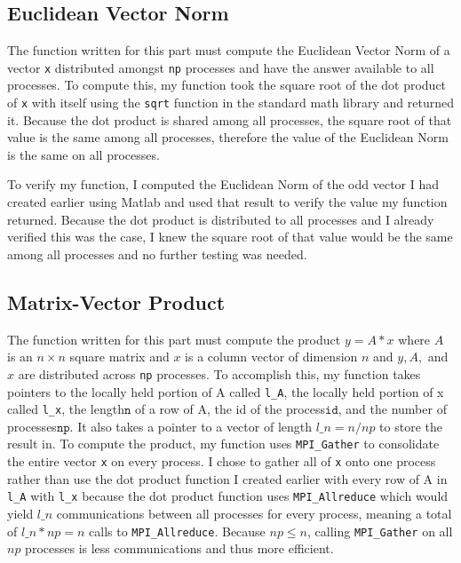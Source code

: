 \documentclass[11pt]{article}
\begin{document}
\subsection{Euclidean Vector Norm}
The function written for this part must compute the Euclidean Vector Norm of a vector \texttt{x} distributed amongst \texttt{np} processes and have the answer available to all processes. To compute this, my function took the square root of the dot product of \texttt{x} with itself using the \texttt{sqrt} function in the standard math library and returned it. Because the dot product is shared among all processes, the square root of that value is the same among all processes, therefore the value of the Euclidean Norm is the same on all processes.

To verify my function, I computed the Euclidean Norm of the odd vector I had created earlier using Matlab and used that result to verify the value my function returned. Because the dot product is distributed to all processes and I already verified this was the case, I knew the square root of that value would be the same among all processes and no further testing was needed.

\subsection{Matrix-Vector Product}
The function written for this part must compute the product $y=A*x$ where $A$ is an $n \times n$ square matrix and $x$ is a column vector of dimension $n$ and $y, A,$ and $x$ are distributed across \texttt{np} processes. To accomplish this, my function takes pointers to the locally held portion of A called \texttt{l\_A}, the locally held portion of x called \texttt{l\_x}, the length\(\texttt{n}\) of a row of A, the id of the process\(\texttt{id}\), and the number of processes\(\texttt{np}\). It also takes a pointer to a vector of length $ l\_n = n / np $ to store the result in. To compute the product, my function uses \texttt{MPI\_Gather} to consolidate the entire vector \texttt{x} on every process. I chose to gather all of \texttt{x} onto one process rather than use the dot product function I created earlier with every row of A in \texttt{l\_A} with \texttt{l\_x} because the dot product function uses \texttt{MPI\_Allreduce} which would yield $ l\_n $ communications between all processes for every process, meaning a total of $ l\_n * np = n$ calls to \texttt{MPI\_Allreduce}. Because $ np \leq n $, calling \texttt{MPI\_Gather} on all $np$ processes is less communications and thus more efficient.
\end{document}
